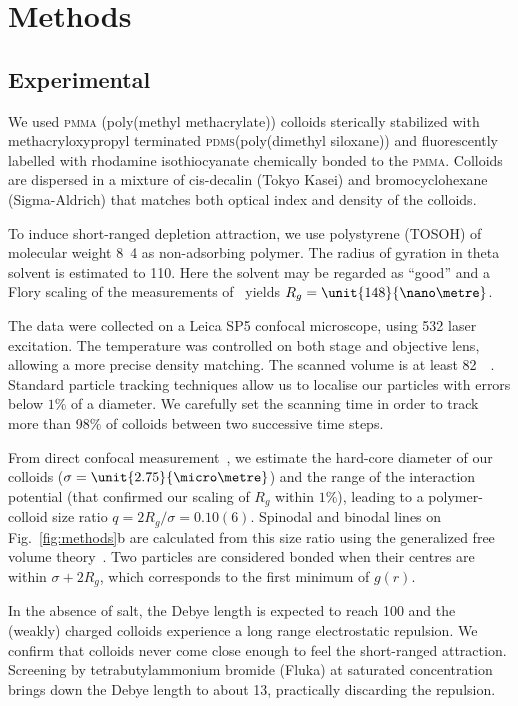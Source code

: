 \section*{Methods}

\subsection*{Experimental}

We used \textsc{pmma} (poly(methyl methacrylate)) colloids sterically stabilized with methacryloxypropyl terminated \textsc{pdms}(poly(dimethyl siloxane)) and fluorescently labelled with rhodamine isothiocyanate chemically bonded to the \textsc{pmma}. Colloids are dispersed in a mixture of cis-decalin (Tokyo Kasei) and bromocyclohexane (Sigma-Aldrich) that matches both optical index and density of the colloids.

To induce short-ranged depletion attraction, we use polystyrene (TOSOH) of molecular weight \unit{8.4}{\mega\dalton} as non-adsorbing polymer. The radius of gyration in theta solvent is estimated to \unit{110}{\nano\metre}. Here the solvent may be regarded as ``good'' and a Flory scaling of the measurements of~\cite{lu2008gelation} yields $R_g=\unit{148}{\nano\metre}$.

The data were collected on a Leica SP5 confocal microscope, using \unit{532}{\nano\meter} laser excitation. The temperature was controlled on both stage and objective lens, allowing a more precise density matching. The scanned volume is at least \unit{82  }{\micro\metre}. Standard particle tracking techniques allow us to localise our particles with errors below $1\%$ of a diameter. We carefully set the scanning time in order to track more than \unit{98}\% of colloids between two successive time steps.

From direct confocal measurement~\cite{Royall2007, Poon2012}, we estimate the hard-core diameter of our colloids ($\sigma=\unit{2.75}{\micro\metre}$) and the range of the interaction potential (that confirmed our scaling of $R_g$ within $1\%$), leading to a polymer-colloid size ratio $q = 2R_g/\sigma = 0.10(6)$. Spinodal and binodal lines on Fig.~\ref{fig:methods}b are calculated from this size ratio using the generalized free volume theory~\cite{Fleer2008}. Two particles are considered bonded when their centres are within $\sigma+2R_g$, which corresponds to the first minimum of $g(r)$.

In the absence of salt, the Debye length is expected to reach \unit{100}{\nano\metre} and the (weakly) charged colloids experience a long range electrostatic repulsion. We confirm that colloids never come close enough to feel the short-ranged attraction. Screening by tetrabutylammonium bromide (Fluka) at saturated concentration brings down the Debye length to about \unit{13}{\nano\metre}, practically discarding the repulsion.

